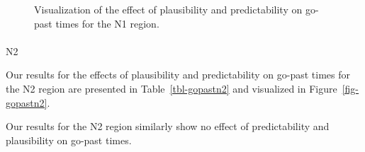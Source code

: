 \documentclass[
  12pt,
  letterpaper,
]{scrreprt}
\makeatletter
\let\oldparagraph\paragraph
\renewcommand{\paragraph}{
    \@ifstar
      \xxxParagraphStar
      \xxxParagraphNoStar
  }
\newcommand{\xxxParagraphStar}[1]{\oldparagraph*{#1}\mbox{}}
\newcommand{\xxxParagraphNoStar}[1]{\oldparagraph{#1}\mbox{}}
\makeatother
\begin{document}
\begin{figure}[htbp]

\caption{\label{fig-gopastn1}Visualization of the effect of plausibility
and predictability on go-past times for the N1 region.}


\end{figure}%

\paragraph{N2}\label{n2-6}

Our results for the effects of plausibility and predictability on
go-past times for the N2 region are presented in
Table~\ref{tbl-gopastn2} and visualized in Figure~\ref{fig-gopastn2}.

Our results for the N2 region similarly show no effect of predictability
and plausibility on go-past times.
\end{document}
